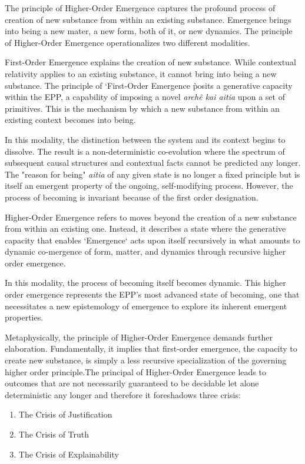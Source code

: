 The principle of Higher-Order Emergence captures the profound process of creation of new substance from within an existing substance. 
Emergence brings into being a new mater, a new form, both of it, or new dynamics. The principle of Higher-Order Emergence operationalizes two different modalities.  

First-Order Emergence explains the creation of new substance. While contextual relativity applies to an existing substance, it cannot bring into being a new substance. The principle of `First-Order Emergence \` posits a generative capacity within the EPP, a capability of imposing a novel \textit{archê kai aitia} upon a set of primitives. This is the mechanism by which a new substance from within an existing context becomes into being.

In this modality, the distinction between the system and its context begins to dissolve. The result is a non-deterministic co-evolution where the spectrum of subsequent causal structures and contextual facts cannot be predicted any longer. The "reason for being" \textit{aitia} of any given state is no longer a fixed principle but is itself an emergent property of the ongoing, self-modifying process. However, the process of becoming is invariant because of the first order designation. 

Higher-Order Emergence refers to moves beyond the creation of a new substance from within an existing one. Instead, it describes a state where the generative capacity that enables `Emergence` acts upon itself recursively in what amounts to  dynamic co-mergence of form, matter, and dynamics through recursive higher order emergence. 

In this modality, the process of becoming itself becomes dynamic. This higher order emergence represents the EPP's most advanced state of becoming, one that necessitates a new epistemology of emergence to explore its inherent emergent properties.


Metaphysically, the principle of Higher-Order Emergence demands further elaboration. Fundamentally, it implies that first-order emergence, the capacity to create new substance, is simply a less recursive specialization of the governing higher order principle.The principal of Higher-Order Emergence leads to outcomes that are not necessarily guaranteed to be decidable let alone deterministic any longer and therefore it foreshadows three crisis:

\begin{enumerate}
	\item The Crisis of Justification
	\item The Crisis of Truth
	\item The Crisis of Explainability
\end{enumerate}


